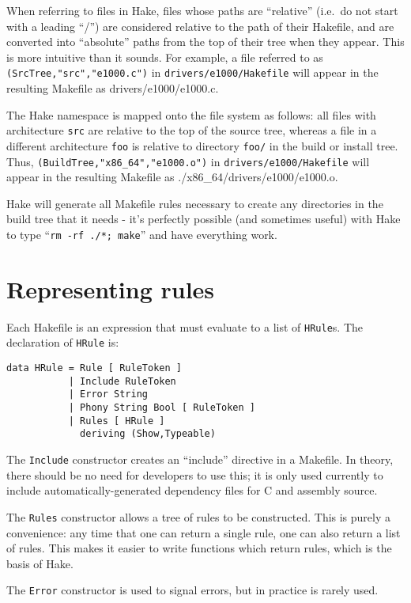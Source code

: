\documentclass[a4paper,twoside]{report} %
\begin{document}
When referring to files in Hake, files whose paths are ``relative''
(i.e.\ do not start with a leading ``/'') are considered relative to
the path of their Hakefile, and are converted into
``absolute'' paths from the top of their tree when they appear.
This is more intuitive than it sounds.  For example, a file referred
to as \texttt{(SrcTree,"src","e1000.c")} in
\texttt{drivers/e1000/Hakefile} will appear in the resulting Makefile
as {drivers/e1000/e1000.c}.  

The Hake namespace is mapped onto the file system as follows: all
files with architecture \texttt{src} are relative to the top of the
source tree, whereas a file in a different architecture \texttt{foo}
is relative to directory \texttt{foo/} in the build or install tree.
Thus, \texttt{(BuildTree,"x86\_64","e1000.o")} in
\texttt{drivers/e1000/Hakefile} will  appear in the resulting Makefile
as {./x86\_64/drivers/e1000/e1000.o}. 

Hake will generate all Makefile rules necessary to create any
directories in the build tree that it needs - it's perfectly possible
(and sometimes useful) with Hake to type ``\texttt{rm -rf ./*;
  make}'' and have everything work.  

\section{Representing rules}\label{sec:reprules}

Each Hakefile is an expression that must evaluate to a list of
\texttt{HRule}s.  The declaration of \texttt{HRule} is:
\begin{verbatim}
data HRule = Rule [ RuleToken ]
           | Include RuleToken
           | Error String
           | Phony String Bool [ RuleToken ]
           | Rules [ HRule ]
             deriving (Show,Typeable)
\end{verbatim}

The \texttt{Include} constructor creates an ``include'' directive in a
Makefile.  In theory, there should be no need for developers to use
this; it is only used currently to include automatically-generated
dependency files for C and assembly source. 

The \texttt{Rules} constructor allows a tree of rules to be
constructed.  This is purely a convenience: any time that one can
return a single rule, one can also return a list of rules.  This makes
it easier to write functions which return rules, which is the basis of
Hake.

The \texttt{Error} constructor is used to signal errors, but in
practice is rarely used. 
\end{document}
